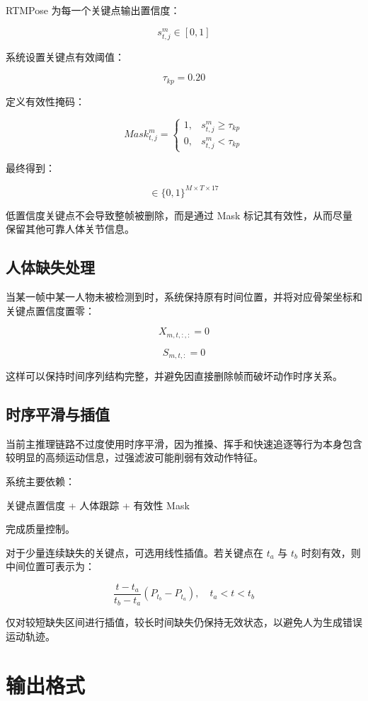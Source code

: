 RTMPose 为每一个关键点输出置信度：

\[
s_{t,j}^{m}\in[0,1]
\]

系统设置关键点有效阈值：

\[
\tau_{kp}=0.20
\]

定义有效性掩码：

\[
Mask_{t,j}^{m}
=
\begin{cases}
1,&s_{t,j}^{m}\geq\tau_{kp}\\
0,&s_{t,j}^{m}<\tau_{kp}
\end{cases}
\]

最终得到：

\[
\in\{0,1\}^{M\times T\times17}
\]

低置信度关键点不会导致整帧被删除，而是通过 Mask 标记其有效性，从而尽量保留其他可靠人体关节信息。

\subsection{人体缺失处理}

当某一帧中某一人物未被检测到时，系统保持原有时间位置，并将对应骨架坐标和关键点置信度置零：

\[
X_{m,t,:,:}=0
\]

\[
S_{m,t,:}=0
\]

这样可以保持时间序列结构完整，并避免因直接删除帧而破坏动作时序关系。

\subsection{时序平滑与插值}

当前主推理链路不过度使用时序平滑，因为推搡、挥手和快速追逐等行为本身包含较明显的高频运动信息，过强滤波可能削弱有效动作特征。

系统主要依赖：

关键点置信度 + 人体跟踪 + 有效性 Mask

完成质量控制。

对于少量连续缺失的关键点，可选用线性插值。若关键点在 \(t_a\) 与 \(t_b\) 时刻有效，则中间位置可表示为：

\[
\frac{t-t_a}{t_b-t_a}
(P_{t_b}-P_{t_a}),
\quad
t_a<t<t_b
\]

仅对较短缺失区间进行插值，较长时间缺失仍保持无效状态，以避免人为生成错误运动轨迹。

\section{输出格式}

